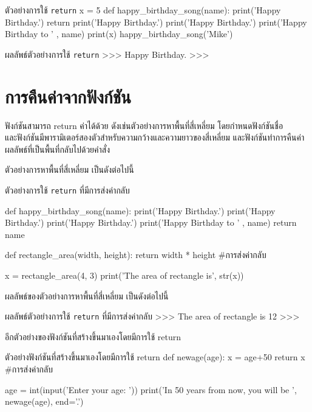 \begin{codelist}{ตัวอย่างการใช้ \texttt{return}}{}
x = 5
def happy_birthday_song(name):
    print('Happy Birthday.')
    return
    print('Happy Birthday.')
    print('Happy Birthday.')
    print('Happy Birthday to ' , name)
    print(x)
happy_birthday_song('Mike')
\end{codelist}

\begin{codelist}{ผลลัพธ์ตัวอย่างการใช้ \texttt{return}}{}
>>>
Happy Birthday.
>>>
\end{codelist}

\section{การคืนค่าจากฟังก์ชัน}

ฟังก์ชันสามารถ return ค่าได้ด้วย ดังเช่นตัวอย่างการหาพื้นที่สี่เหลี่ยม โดยกำหนดฟังก์ชันชื่อ \\   และฟังก์ชันมีพารามิเตอร์สองตัวสำหรับความกว้างและความยาวของสี่เหลี่ยม และฟังก์ชันทำการคืนค่า ผลลัพธ์ที่เป็นพื้นที่กลับไปด้วยคำสั่ง 

ตัวอย่างการหาพื้นที่สี่เหลี่ยม  เป็นดังต่อไปนี้

\begin{codelist}{ตัวอย่างการใช้ \texttt{return} ที่มีการส่งค่ากลับ}{}

def happy_birthday_song(name):
    print('Happy Birthday.')
    print('Happy Birthday.')
    print('Happy Birthday.')
    print('Happy Birthday to ' , name)
    return name

def rectangle_area(width, height):
    return width * height  #การส่งค่ากลับ
    
x = rectangle_area(4, 3)
print('The area of rectangle is', str(x))
\end{codelist}

ผลลัพธ์ของตัวอย่างการหาพื้นที่สี่เหลี่ยม เป็นดังต่อไปนี้

\begin{codelist}{ผลลัพธ์ตัวอย่างการใช้ \texttt{return} ที่มีการส่งค่ากลับ}{}
>>>
The area of rectangle is 12
>>>
\end{codelist}


อีกตัวอย่างของฟังก์ชันที่สร้างขึ้นมาเองโดยมีการใช้ return

\begin{codelist}{ตัวอย่างฟังก์ชันที่สร้างขึ้นมาเองโดยมีการใช้ return}{}
def newage(age):
    x = age+50
    return x #การส่งค่ากลับ

age = int(input('Enter your age: '))
print('In 50 years from now, you will be ', newage(age), end='.')
\end{codelist}


